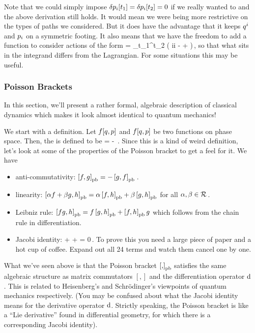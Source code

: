 Note that we could simply impose $\delta{p}_{i}\!\left[{t_1}\right] = \delta{p}_{i}\!\left[{t_2}\right] = 0$ if we really wanted to and the above derivation still holds. It would mean we were being more restrictive on the types of paths we considered. But it does have the advantage that it keeps ${q}^{i}$ and ${p}_{i}$ on a symmetric footing. It also means that we have the freedom to add a function to consider actions of the form
\beq
\action = \int_{t_1}^{t_2}
            \left( 
                \gmom i\gvel i 
                - \ham\vat{\gpvec, \lmom} 
                +  
            \right)\,,
\eeq
so that what sits in the integrand differs from the Lagrangian. For some situations this may be useful.


\subsubsection{Poisson Brackets}
In this section, we'll present a rather formal, algebraic description of classical dynamics which makes it look almost identical to quantum mechanics!

We start with a definition. Let $f\!\left[{q, p}\right]$ and $f\!\left[{q, p}\right]$ be two functions on phase space. Then, the  is defined to be
\beq
{} =  - \,.
\eeq
Since this is a kind of weird definition, let’s look at some of the properties of the Poisson bracket to get a feel for it. We have
\begin{itemize}
\item anti-commutativity: $\left[{f,g}\right]_{\text{pb}} = -\left[{g,f}\right]_{\text{pb}}$\,.
%
\item linearity: $\left[{\alpha f + \beta g, h}\right]_{\text{pb}} = \alpha\left[{f,h}\right]_{\text{pb}} + \beta\left[{g,h}\right]_{\text{pb}}$ for all $\alpha,\beta\in\mathcal{R}$\,.
%
\item Leibniz rule: $\left[{fg,h}\right]_{\text{pb}} = f\left[{g,h}\right]_{\text{pb}} + \left[{f,h}\right]_{\text{pb}}g$ which follows from the chain rule in differentiation.
%
\item Jacobi identity:
\beq
{} +  +  = 0\,.
\eeq
To prove this you need a large piece of paper and a hot cup of coffee. Expand out all 24 terms and watch them cancel one by one.
\end{itemize}

What we've seen above is that the Poisson bracket $\left[{,}\right]_{\text{pb}}$ satisfies the same algebraic structure as matrix commutators $[,]$ and the differentiation operator $\text{d}{}$. This is related to Heisenberg's and Schrödinger's viewpoints of quantum mechanics respectively. (You may be confused about what the Jacobi identity means for the derivative operator $\text{d}{}$. Strictly speaking, the Poisson bracket is like a ``Lie derivative'' found in differential geometry, for which there is a corresponding Jacobi identity).

